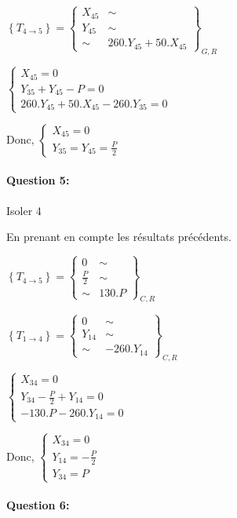 $\left\{T_{4\rightarrow 5}\right\}=\left\{
\begin{array}{cc}
X_{45} & \sim \\
Y_{45} & \sim \\
\sim & 260.Y_{45}+50.X_{45}
\end{array}
\right\}_{G,R}$

$\left\{\begin{array}{l}
X_{45}=0 \\
Y_{35}+Y_{45}-P=0 \\
260.Y_{45}+50.X_{45}-260.Y_{35}=0
\end{array}\right.$

Donc, $\left\{\begin{array}{l}
X_{45}=0 \\
Y_{35}=Y_{45}=\frac{P}{2}
\end{array}\right.$

\paragraph{Question 5:}

Isoler 4

En prenant en compte les résultats précédents.

$\left\{T_{4\rightarrow 5}\right\}=\left\{
\begin{array}{cc}
0 & \sim \\
\frac{P}{2} & \sim \\
\sim & 130.P
\end{array}
\right\}_{C,R}$

$\left\{T_{1\rightarrow 4}\right\}=\left\{
\begin{array}{cc}
0 & \sim \\
Y_{14} & \sim \\
\sim & -260.Y_{14}
\end{array}
\right\}_{C,R}$

$\left\{\begin{array}{l}
X_{34}=0 \\
Y_{34}-\frac{P}{2}+Y_{14}=0 \\
-130.P-260.Y_{14}=0
\end{array}\right.$

Donc, $\left\{\begin{array}{l}
X_{34}=0 \\
Y_{14}=-\frac{P}{2} \\
Y_{34}=P
\end{array}\right.$

\paragraph{Question 6:}

